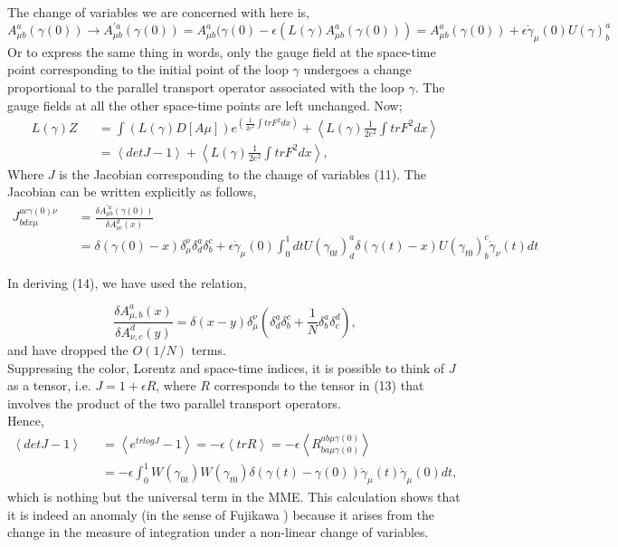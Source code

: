 \documentclass[a4paper,12]{article}
\begin{document}
The change of variables we are concerned with here is,
\begin{equation}
A^{ a}_{\mu b}(\gamma (0)) \rightarrow A^{\prime a}_{\mu b}(\gamma (0)) = 
A^a_{\mu b}(\gamma (0) - \epsilon \left(L(\gamma )A^a_{\mu 
b}(\gamma(0))\right) = 
A^a_{\mu b}(\gamma (0)) + \epsilon \dot{\gamma }_\mu (0)U(\gamma )^a_b
\end{equation} 
Or to express the same thing in words, only the gauge field at the 
space-time point corresponding to the initial point of the loop $\gamma $ 
undergoes a change proportional to the parallel transport operator 
associated with the loop $\gamma $. The gauge fields at all the other 
space-time points are left unchanged. Now; 
\begin{eqnarray} 
L(\gamma )Z & &= \int \left( L(\gamma )D[A\mu 
]\right)e^{\left(\frac{1}{2e^2}\int tr F^2 dx\right)} + \left< L(\gamma 
)\frac{1}{2e^2}\int tr F^2 dx \right> \nonumber \\
& &= \left<det J - 1\right> + \left<L(\gamma )\frac{1}{2e^2}\int tr 
F^2dx\right>,
\end{eqnarray}
Where $J$ is the Jacobian corresponding to the change of variables (11). 
The 
Jacobian can be written explicitly as follows,
\begin{eqnarray}
J^{a c \gamma (0) \nu }_{b d x \mu} & &= \frac{\delta A^{\prime a} _{\mu b 
}(\gamma (0))}{\delta A^{d}_{\nu c}(x)}  \\
& &= \delta (\gamma (0) - 
x)\delta 
^\nu _\mu \delta ^a _d \delta ^c _b + \epsilon \dot{\gamma }_\mu (0) \int 
_0 ^1 dt U(\gamma _{0t})^a _d \delta (\gamma (t) - x )U(\gamma _{t0})^c _b 
\dot{\gamma }_\nu (t)dt \nonumber
\end{eqnarray}

In deriving (14), we have used the relation,

\begin{equation}
\frac{\delta A^{a}_{\mu , b}(x)}{\delta A^d _{\nu , c}(y)} = \delta
(x - y)\delta ^{\nu }_{\mu }\left( \delta ^a_d \delta ^c_b +
\frac{1}{N}\delta ^a _b \delta ^d_c \right),
\end{equation}
and have dropped the $O(1/N)$ terms.\\

Suppressing the color, Lorentz and space-time indices, it is possible to 
think of $J$ as a tensor, i.e. $J = 1 + \epsilon R$, where $R$ corresponds 
to the tensor in (13) that involves the product of the two parallel 
transport operators.\\
Hence,
\begin{eqnarray}
\left< det J - 1\right> & &= \left< e^{trlog J} -1 \right> = -\epsilon 
\left< 
tr R\right> = -\epsilon \left< R^{a b \mu \gamma (0)}_{b a \mu \gamma 
(0)}\right> \\
& &= -\epsilon \int_0 ^1 W(\gamma _{0t})W(\gamma _{t0})\delta 
(\gamma (t) -\gamma (0))\dot{\gamma }_\mu (t) \dot{\gamma }_\mu (0)dt, 
\nonumber
\end{eqnarray}
which is nothing but the universal term in the MME. This calculation shows 
that it is indeed an anomaly (in the sense of Fujikawa \cite{Fujikawa}) 
because it arises 
from the change in the measure of integration under a non-linear change of 
variables.\\
\end{document}
